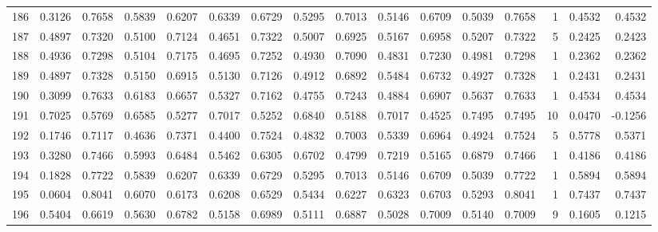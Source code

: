 \begin{tabular}{lrrrrrrrrrrrrrrr}
186 &      0.3126 &  0.7658 &  0.5839 &  0.6207 &  0.6339 &  0.6729 &  0.5295 &  0.7013 &  0.5146 &  0.6709 &   0.5039 &     0.7658 &      1 &                    0.4532 &                     0.4532 \\
187 &      0.4897 &  0.7320 &  0.5100 &  0.7124 &  0.4651 &  0.7322 &  0.5007 &  0.6925 &  0.5167 &  0.6958 &   0.5207 &     0.7322 &      5 &                    0.2425 &                     0.2423 \\
188 &      0.4936 &  0.7298 &  0.5104 &  0.7175 &  0.4695 &  0.7252 &  0.4930 &  0.7090 &  0.4831 &  0.7230 &   0.4981 &     0.7298 &      1 &                    0.2362 &                     0.2362 \\
189 &      0.4897 &  0.7328 &  0.5150 &  0.6915 &  0.5130 &  0.7126 &  0.4912 &  0.6892 &  0.5484 &  0.6732 &   0.4927 &     0.7328 &      1 &                    0.2431 &                     0.2431 \\
190 &      0.3099 &  0.7633 &  0.6183 &  0.6657 &  0.5327 &  0.7162 &  0.4755 &  0.7243 &  0.4884 &  0.6907 &   0.5637 &     0.7633 &      1 &                    0.4534 &                     0.4534 \\
191 &      0.7025 &  0.5769 &  0.6585 &  0.5277 &  0.7017 &  0.5252 &  0.6840 &  0.5188 &  0.7017 &  0.4525 &   0.7495 &     0.7495 &     10 &                    0.0470 &                    -0.1256 \\
192 &      0.1746 &  0.7117 &  0.4636 &  0.7371 &  0.4400 &  0.7524 &  0.4832 &  0.7003 &  0.5339 &  0.6964 &   0.4924 &     0.7524 &      5 &                    0.5778 &                     0.5371 \\
193 &      0.3280 &  0.7466 &  0.5993 &  0.6484 &  0.5462 &  0.6305 &  0.6702 &  0.4799 &  0.7219 &  0.5165 &   0.6879 &     0.7466 &      1 &                    0.4186 &                     0.4186 \\
194 &      0.1828 &  0.7722 &  0.5839 &  0.6207 &  0.6339 &  0.6729 &  0.5295 &  0.7013 &  0.5146 &  0.6709 &   0.5039 &     0.7722 &      1 &                    0.5894 &                     0.5894 \\
195 &      0.0604 &  0.8041 &  0.6070 &  0.6173 &  0.6208 &  0.6529 &  0.5434 &  0.6227 &  0.6323 &  0.6703 &   0.5293 &     0.8041 &      1 &                    0.7437 &                     0.7437 \\
196 &      0.5404 &  0.6619 &  0.5630 &  0.6782 &  0.5158 &  0.6989 &  0.5111 &  0.6887 &  0.5028 &  0.7009 &   0.5140 &     0.7009 &      9 &                    0.1605 &                     0.1215 \\

\end{tabular}

